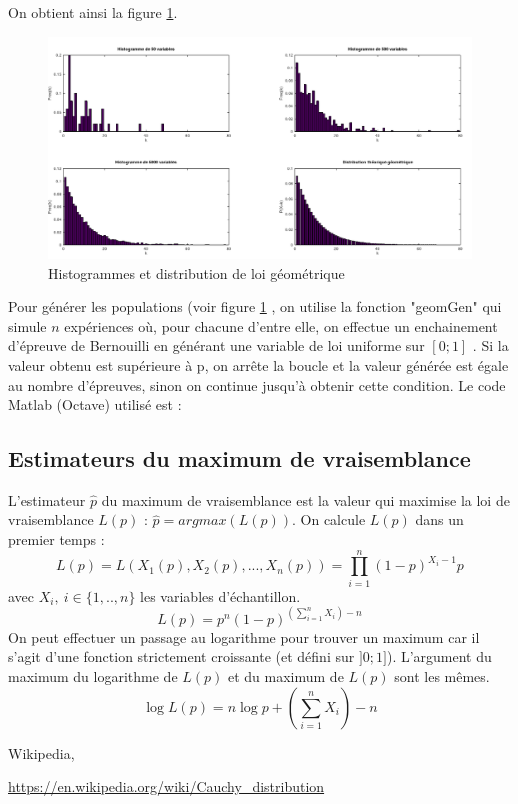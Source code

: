 \documentclass[12pt,a4paper,titlepage]{article}
\numberwithin{equation}{section}
\begin{document}


On obtient ainsi la figure \ref{Histogrammes et distribution de loi géométrique}.

\begin{figure}[!h]
\label{Histogrammes et distribution de loi géométrique}
\centering
\includegraphics[scale=0.3]{images/histGeom.png} 
\caption{Histogrammes et distribution de loi géométrique}
\end{figure}

Pour générer les populations (voir figure \ref{Histogrammes et distribution de loi géométrique} , on utilise la fonction "geomGen" qui simule $n$ expériences où, pour chacune d'entre elle, on effectue un enchainement
d'épreuve de Bernouilli en générant une variable de loi uniforme sur
$[0;1]$ . Si la valeur obtenu est supérieure à p, on arrête la boucle
et la valeur générée est égale au nombre d'épreuves, sinon on continue 
jusqu'à obtenir cette condition. Le code Matlab (Octave) utilisé est :




\subsection{Estimateurs du maximum de vraisemblance}

L'estimateur $\hat{p}$ du maximum de vraisemblance est la valeur qui
maximise la loi de vraisemblance $L(p)$ : $\hat{p}=argmax(L(p))$.
On calcule $L(p)$ dans un premier temps :
\[L(p)=L(X_1(p),X_2(p),...,X_n(p))=\prod\limits_{i=1}^{n}(1-p)^{X_i-1}p \]
avec $X_i,\ i\in\{1,..,n\}$ les variables d'échantillon.
\[L(p)=p^n(1-p)^{(\sum\limits_{i=1}^{n}X_i)-n}\]
On peut effectuer un passage au logarithme pour trouver un maximum car il s'agit
d'une fonction strictement croissante (et défini sur $]0;1]$). L'argument du maximum du logarithme
de $L(p)$ et du maximum de $L(p)$ sont les mêmes.
\[\log{L(p)}=n\log{p}+(\sum\limits_{i=1}^{n}X_i)-n\]

\begin{thebibliography}{3}

Wikipedia,

\url{https://en.wikipedia.org/wiki/Cauchy_distribution}

\end{thebibliography}
\end{document}
